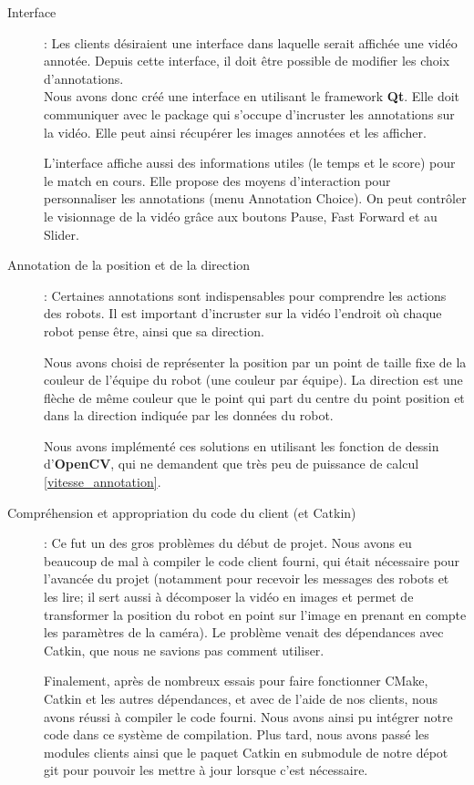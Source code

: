 \begin{description}
    \item[Interface]: Les clients désiraient une interface dans 
    laquelle serait affichée une vidéo annotée. Depuis cette 
    interface, il doit être possible de modifier les choix 
    d'annotations.\\
    
    Nous avons donc créé une interface en utilisant le framework 
    \textbf{Qt}. Elle doit communiquer avec le package qui 
    s'occupe d'incruster les annotations sur la vidéo. Elle peut 
    ainsi récupérer les images annotées et les afficher.
    \bigskip
    
    L'interface affiche aussi des informations utiles (le temps 
    et le score) pour le match en cours. Elle propose des moyens 
    d'interaction pour personnaliser les annotations (menu 
    Annotation Choice). On peut contrôler le visionnage de la 
    vidéo grâce aux boutons Pause, Fast Forward et au Slider.
    \bigskip
    \item[Annotation de la position et de la direction] : 
    Certaines annotations sont indispensables pour comprendre les
    actions des robots. Il est important d'incruster sur la vidéo
    l'endroit où chaque robot pense être, ainsi que sa direction.
    \bigskip
    
    Nous avons choisi de représenter la position par un point de 
    taille fixe de la couleur de l'équipe du robot (une couleur 
    par équipe).  La direction est une flèche de même couleur que
    le point qui part du centre du point position et dans la
    direction indiquée par les données du robot.
    \bigskip
    
    Nous avons implémenté ces solutions en utilisant les fonction
    de dessin d'\textbf{OpenCV}, qui ne demandent que très peu de
    puissance de calcul \ref{vitesse_annotation}. 
    \bigskip
    
    \item[Compréhension et appropriation du code du client (et 
    Catkin)]: Ce fut un des gros problèmes du début de projet. 
    Nous avons eu beaucoup de mal à compiler le code client 
    fourni, qui était nécessaire pour l'avancée du projet 
    (notamment pour recevoir les messages des robots et les lire;
    il sert aussi à décomposer la vidéo en images et permet de
    transformer la position du robot en point sur l'image en 
    prenant en compte les paramètres de la caméra). Le problème 
    venait des dépendances avec Catkin, que nous ne savions pas 
    comment utiliser.
    \bigskip
    
    Finalement, après de nombreux essais pour faire fonctionner 
    CMake, Catkin et les autres dépendances, et avec de l'aide de
    nos clients, nous avons réussi à compiler le code fourni.
    Nous avons ainsi pu intégrer notre code dans ce système de 
    compilation. Plus tard, nous avons passé les modules clients 
    ainsi que le paquet Catkin en  submodule de notre dépot git 
    pour pouvoir les mettre à jour lorsque c'est nécessaire.
\end{description}

